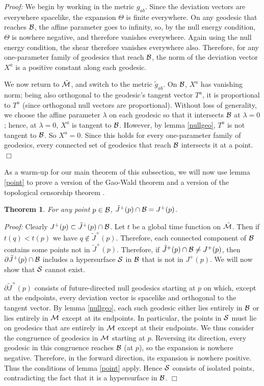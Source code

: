 \documentclass[12pt]{article}
\def\bulkJ{{\tilde J}}
\def\bulk{{\cal M}}
\def\bdy{{\cal B}}
\def\overM{\tilde \bulk}
\newtheorem{theorem}{Theorem}
\begin{document}
\emph{Proof:} We begin by working in the metric $g_{ab}$. Since the deviation vectors are everywhere spacelike, the expansion $\Theta$ is finite everywhere. On any geodesic that reaches $\bdy$, the affine parameter goes to infinity, so, by the null energy condition, 
$\Theta$ is nowhere negative, and therefore vanishes everywhere. Again using the null energy condition, the shear therefore vanishes everywhere also. Therefore, for any one-parameter family of geodesics that reach $\bdy$, the norm of the deviation vector $X^a$ is a positive constant along each geodesic.

We now return to $\overM$, and switch to the metric $\tilde g_{ab}$. On $\bdy$, $X^a$ has vanishing norm; being also orthogonal to the geodesic's tangent vector $T^a$, it is proportional to $T^a$ (since orthogonal null vectors are proportional). Without loss of generality, we choose the affine parameter $\lambda$ on each geodesic so that it intersects $\bdy$ at $\lambda=0$; hence, at 
$\lambda=0$, $X^a$ is tangent to $\bdy$. However, by lemma \ref{nullgeo}, $T^a$ is not tangent to $\bdy$. So $X^a=0$. Since this holds for every one-parameter family of geodesics, every connected set of geodesics that reach $\bdy$ intersects it at a point. $\Box$\bigskip

As a warm-up for our main theorem of this subsection, we will now use lemma \ref{point} to prove a version of the Gao-Wald theorem \cite{Gao:2000ga} and a version of the topological censorship theorem \cite{Galloway:1999br}.

\begin{theorem}\label{pointJ}For any point $p\in\bdy$, $\bulkJ^+(p)\cap\bdy=J^+(p)$.\end{theorem}

\emph{Proof:} Clearly $J^+(p) \subset \bulkJ^+(p) \cap\bdy$. Let $t$ be a global time function on $\overM$. Then if $t(q)<t(p)$ we have $q\notin \bulkJ^+(p)$. Therefore, each connected component of $\bdy$ contains some points not in $\bulkJ^+(p)$. Therefore, if 
$\bulkJ^+(p)\cap\bdy\neq J^+(p)$, then $\partial\bulkJ^+(p)\cap\bdy$ includes a hypersurface ${\cal S}$ in $\bdy$ that is not in $J^+(p)$. We will now show that ${\cal S}$ cannot exist.

$\partial \bulkJ^+(p)$ consists of future-directed null geodesics starting at $p$ on which, except at the endpoints, every deviation vector is spacelike and orthogonal to the tangent vector. By lemma \ref{nullgeo}, each such geodesic either lies entirely in $\bdy$ or lies entirely in $\bulk$ except at its endpoints. In particular, the points in ${\cal S}$ must lie on geodesics that are entirely in $\bulk$ except at their endpoints. We thus consider the congruence of geodesics in $\bulk$ starting at $p$. Reversing its direction, every geodesic in this congruence reaches $\bdy$ (at $p$), so the expansion is nowhere negative. Therefore, in the forward direction, its expansion is nowhere positive. Thus the conditions of lemma \ref{point} apply. Hence ${\cal S}$ consists of isolated points, contradicting the fact that it is a hypersurface in $\bdy$. $\Box$
\end{document}

